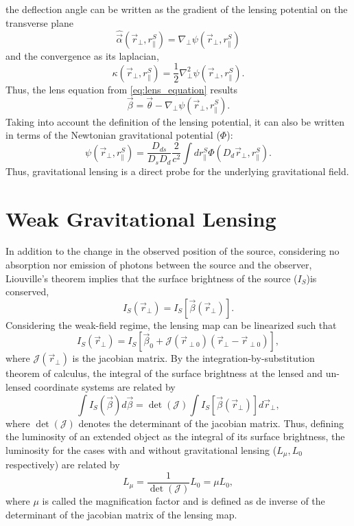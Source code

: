 the deflection angle can be written as the gradient of the lensing potential on the transverse plane
\begin{equation}
\hat\vec\alpha(\vec r_\perp,r_\parallel^S) = \nabla_\perp\psi(\vec r_\perp,r_\parallel^S)
\end{equation}
and the convergence as its laplacian,
\begin{equation}
\kappa(\vec r_\perp,r_\parallel^S)=\frac{1}{2}\nabla^2_\perp\psi(\vec r_\perp,r_\parallel^S).
\end{equation}
Thus, the lens equation from \autoref{eq:lens_equation} results
\begin{equation}
\vec\beta = \vec\theta-\nabla_\perp\psi(\vec r_\perp,r_\parallel^S).
\label{eq:lens_equation_2d}
\end{equation}
Taking into account the definition of the lensing potential, it can also be written in terms of the Newtonian gravitational potential ($\Phi$):
\begin{equation}
\psi(\vec r_\perp,r_\parallel^S) = \frac{D_{ds}}{D_sD_d}\frac{2}{c^2}\int dr_\parallel^S\Phi(D_d\vec r_\perp,r_\parallel^S).
\end{equation}
Thus, gravitational lensing is a direct probe for the underlying gravitational field.

\section{Weak Gravitational Lensing}

In addition to the change in the observed position of the source, considering no absorption nor emission of photons between the source and the observer, Liouville's theorem implies that the surface brightness of the source ($I_S$)is conserved,
\begin{equation}
I_S(\vec r_\perp) = I_S[\vec\beta(\vec r_\perp)].
\end{equation}
Considering the weak-field regime, the lensing map can be linearized such that
\begin{equation}
I_S(\vec r_\perp)=I_S[\vec\beta_0+\mathcal{J}(\vec r_{\perp 0})(\vec r_\perp-\vec r_{\perp0})],
\end{equation}
where $\mathcal{J}(\vec r_\perp)$ is the jacobian matrix. By the integration-by-substitution theorem of calculus, the integral of the surface brightness at the lensed and un-lensed coordinate systems are related by
\begin{equation}
\int I_S(\vec\beta)d\vec\beta = \det(\mathcal{J})\int I_S[\vec\beta(\vec r_\perp)]d\vec r_\perp,
\end{equation}
where $\det(\mathcal{J})$ denotes the determinant of the jacobian matrix. Thus, defining the luminosity of an extended object as the integral of its surface brightness, the luminosity for the cases with and without gravitational lensing ($L_\mu,L_0$ respectively) are related by
\begin{equation}
L_\mu = \frac{1}{\det(\mathcal{J})}L_0 = \mu L_0,
\end{equation}
where $\mu$ is called the magnification factor and is defined as de inverse of the determinant of the jacobian matrix of the lensing map.
\newline

